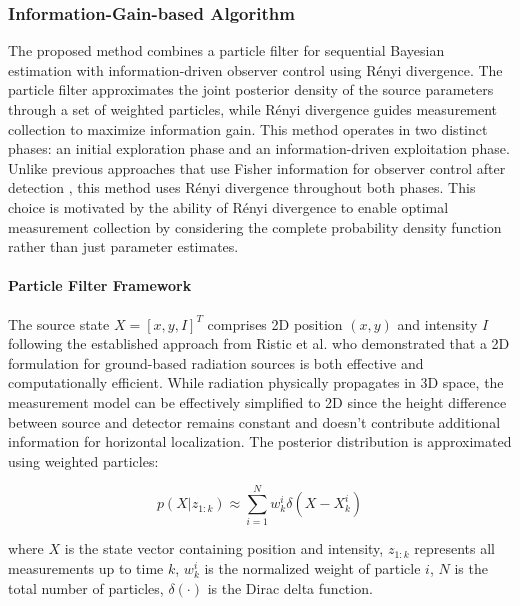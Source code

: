 \documentclass[../report.tex]{subfiles}
\begin{document}
    \subsubsection{Information-Gain-based Algorithm}

    The proposed method combines a particle filter for sequential Bayesian estimation with information-driven observer control using Rényi divergence. The particle filter approximates
    the joint posterior density of the source parameters through a set of weighted particles, while Rényi divergence guides measurement collection to maximize information gain. 
    This method operates in two distinct phases: an initial exploration phase and an information-driven exploitation phase. Unlike previous approaches that use Fisher information for observer control
    after detection \cite{Ristic2007AnIG}, this method uses Rényi divergence throughout both phases. This choice is motivated by the ability of Rényi divergence to enable optimal measurement collection 
    by considering the complete probability density function rather than just parameter estimates.

    \paragraph{Particle Filter Framework}
    The source state $X = [x, y, I]^T$ comprises 2D position $(x,y)$ and intensity $I$ following the established approach from Ristic et al. who demonstrated that a 2D formulation for ground-based 
    radiation sources is both effective and computationally efficient. While radiation physically propagates in 3D space, the measurement model can be effectively simplified to 2D since the height
    difference between source and detector remains constant and doesn't contribute additional information for horizontal localization. 
    The posterior distribution is approximated using weighted particles:

    \begin{equation}
    p(X|z_{1:k}) \approx \sum_{i=1}^N w_k^i \delta(X - X_k^i)
    \end{equation}

    where $X$ is the state vector containing position and intensity, $z_{1:k}$ represents all measurements up to time $k$, $w_k^i$ is the normalized weight of particle $i$, $N$ is the total number 
    of particles, $\delta(\cdot)$ is the Dirac delta function. 
\end{document}

